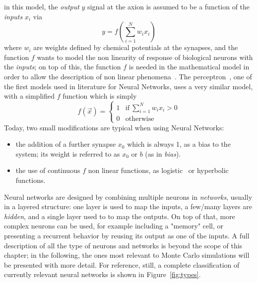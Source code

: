  in this model, the \emph{output} $y$ signal at the axion is assumed to be a function of the \emph{inputs} $x_i$ via
 \begin{equation}
   y = f(\sum_{i=1}^{N} w_i x_i)
   \label{eq:artificialneuron}
 \end{equation}
where $w_i$ are weights defined by chemical potentials at the synapses, and the function $f$ wants to model the non linearity of response of biological neurons with the \emph{inputs}; on top of this, the function $f$ is needed in the mathematical model in order to allow the description of non linear phenomena~\cite{nonlinearitytheorem}. The perceptron~\cite{perceptron}, one of the first models used in literature for Neural Networks, uses a very similar model, with a simplified $f$ function which is simply
\begin{equation}
  f(\vec{x})= \begin{cases}
                1 &  \text{if}\  \sum_{i=1}^{N} w_i x_i >0 \\
                0 &  \text{otherwise}
              \end{cases}
\end{equation}
Today, two small modifications are typical when using Neural Networks:
\begin{itemize}
\item the addition of a further synapse $x_0$ which is always 1, as a bias to the system; its weight is referred to as $x_0$ or $b$ (as in \emph{bias}).
\item the use of continuous $f$ non linear functions, as  logistic~\cite{logistic} or hyperbolic~\cite{logistic} functions.
\end{itemize}
Neural networks are designed by combining multiple neurons in \emph{networks}, usually in a layered structure: one layer is used to map the inputs, a few/many layers are \emph{hidden}, and a single layer used to to map the outputs. On top of that, more complex neurons can be used, for example including a "memory" cell, or presenting a recurrent behavior by reusing its output as one of the inputs. A full description of all the type of neurons and networks is beyond the scope of this chapter; in the following, the ones most relevant to Monte Carlo simulations will be presented with more detail. For reference, still, a complete classification of currently relevant neural networks is shown in Figure~\ref{fig:types}.
